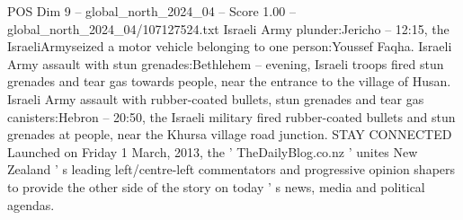 \begin{textsample}{POS Dim 9 – global\_north\_2024\_04 – Score 1.00 – global\_north\_2024\_04/107127524.txt}
Israeli Army plunder:Jericho -- 12:15, the IsraeliArmyseized a motor vehicle belonging to one person:Youssef Faqha.
Israeli Army assault with stun grenades:Bethlehem -- evening, Israeli troops fired stun grenades and tear gas towards people, near the entrance to the village of Husan.
Israeli Army assault with rubber-coated bullets, stun grenades and tear gas canisters:Hebron -- 20:50, the Israeli military fired rubber-coated bullets and stun grenades at people, near the Khursa village road junction.
STAY CONNECTED Launched on Friday 1 March, 2013, the ' TheDailyBlog.co.nz ' unites New Zealand ' s leading left/centre-left commentators and progressive opinion shapers to provide the other side of the story on today ' s news, media and political agendas.

\end{textsample}
